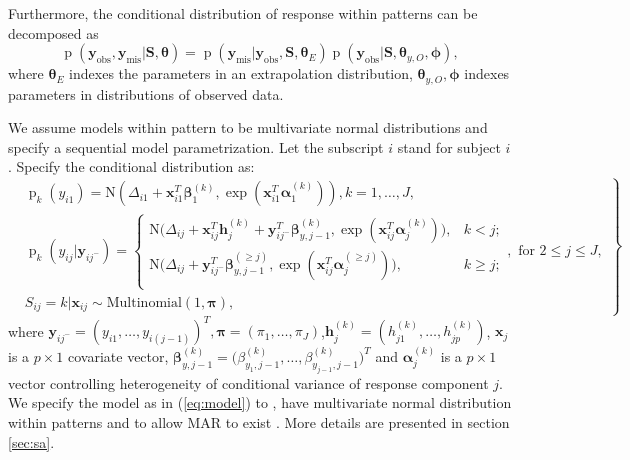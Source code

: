 \documentclass[12pt]{article}
\DeclareMathOperator{\pr}{p}
\newcommand{\yobs}{\bm y_{\text{obs}}}
\newcommand{\ymis}{\bm y_{\text{mis}}}
\begin{document}
Furthermore, the conditional distribution of response within patterns
can be decomposed as
\begin{displaymath} \pr (\yobs, \ymis | \bm S, \bm \theta) = \pr
  (\ymis|\yobs, \bm S, \bm \theta_E) \pr (\yobs | \bm S, \bm
  \theta_{y, O}, \bm \phi),
\end{displaymath}
where $\bm \theta_E$ indexes the parameters in an extrapolation
distribution, $\bm \theta_{y, O}, \bm \phi$ indexes parameters in
distributions of observed data.

We assume models within pattern to be multivariate normal
distributions and specify a sequential model parametrization. Let the
subscript $i$ stand for subject $i$. Specify the conditional
distribution as:
\begin{equation}
  \label{eq:model}
  \left.  \begin{aligned}
      & \pr_k(y_{i1}) = \textrm{N} (\Delta_{i1} + \bm x_{i1}^T \bm \beta_1^{(k)},
      \exp (\bm x_{i1}^T \bm \alpha_1^{(k)} ) ), k = 1, \ldots, J,\\
      &\pr_k(y_{ij}|\bm y_{ij^{-}}) =
      \begin{cases}
        \textrm{N} \big (\Delta_{ij} + \bm x_{ij}^T \bm h_{j}^{(k)} +
        \bm y_{ij^{-}}^T \bm \beta_{y,j-1}^{(k)},
        \exp (\bm x_{ij}^T \bm \alpha_j^{(k)} ) \big), & k < j ;  \\
        \textrm{N} \big (\Delta_{ij} + \bm y_{ij^{-}}^T \bm
        \beta_{y,j-1}^{(\geq j)},
        \exp (\bm x_{ij}^T \bm \alpha_j^{(\geq j)} ) \big), & k \geq j ;  \\
      \end{cases}, \text{ for } 2 \leq j \leq J,  \\
      &S_{ij} = k| \bm x_{ij} \sim \textrm{Multinomial}(1, \bm \pi),
    \end{aligned} \right\}
\end{equation}
where $\bm y_{ij^{-}} = (y_{i1}, \ldots, y_{i(j-1)})^T, \bm \pi =
(\pi_1, \ldots, \pi_J)$,$\bm h_j^{(k)} = (h_{j1}^{(k)}, \ldots,
h_{jp}^{(k)})$, $\bm x_j$ is a $p \times 1$ covariate vector, $\bm
\beta_{y, j-1}^{(k)} = \big(\beta_{y_1, j-1}^{(k)}, \ldots,
\beta_{y_{j-1}, j-1}^{(k)} \big)^T$ and $\bm \alpha_j^{(k)}$ is a $p
\times 1$ vector controlling heterogeneity of conditional variance of
response component $j$. We specify the model as in (\ref{eq:model}) to
, have multivariate normal distribution within patterns and to allow
MAR to exist \citep{wang2011}. More details are presented in section
\ref{sec:sa}.
\end{document}
